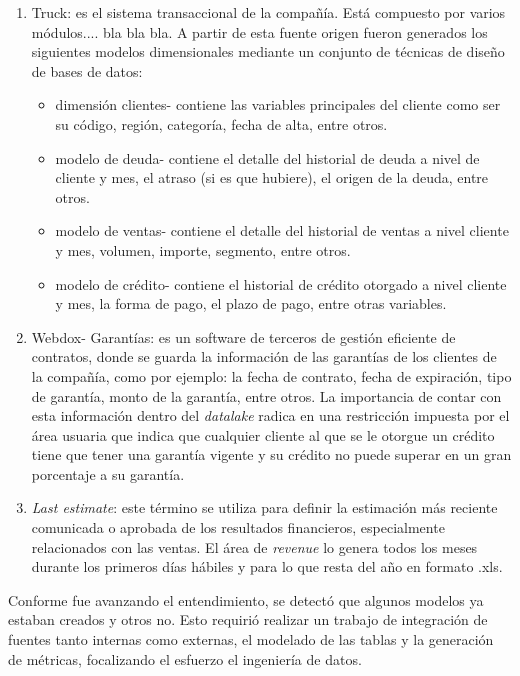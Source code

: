 \begin{enumerate}

\item Truck: es el sistema transaccional de la compañía. Está compuesto por varios módulos.... bla bla bla. A partir de esta fuente origen fueron generados los siguientes modelos dimensionales mediante un conjunto de técnicas de diseño de bases de datos:
	\begin{itemize}
	\item dimensión clientes- contiene las variables principales del cliente como ser su código, región, categoría, fecha de alta, entre otros. 
	\item modelo de deuda- contiene el detalle del historial de deuda a nivel de cliente y mes, el atraso (si es que hubiere), el origen de la deuda, entre otros.
	\item modelo de ventas- contiene el detalle del historial de ventas a nivel cliente y mes, volumen, importe, segmento, entre otros.
	\item modelo de crédito- contiene el historial de crédito otorgado a nivel cliente y mes, la forma de pago, el plazo de pago, entre otras variables.
	\end{itemize}
\item Webdox- Garantías: es un software de terceros de gestión eficiente de contratos, donde se guarda la información de las garantías de los clientes de la compañía, como por ejemplo: la fecha de contrato, fecha de expiración, tipo de garantía, monto de la garantía, entre otros. La importancia de contar con esta información dentro del \textit{datalake} radica en una restricción impuesta por el área usuaria que indica que cualquier cliente al que se le otorgue un crédito tiene que tener una garantía vigente y su crédito no puede superar en un gran porcentaje a su garantía.
\item \textit{Last estimate}: este término se utiliza para definir la estimación más reciente comunicada o aprobada de los resultados financieros, especialmente relacionados con las ventas. El área de \textit{revenue} lo genera todos los meses durante los primeros días hábiles y para lo que resta del año en formato .xls.
\end{enumerate}

Conforme fue avanzando el entendimiento, se detectó que algunos modelos ya estaban creados y otros no. Esto requirió realizar un trabajo de integración de fuentes tanto internas como externas, el modelado de las tablas y la generación de métricas, focalizando el esfuerzo el ingeniería de datos. 

